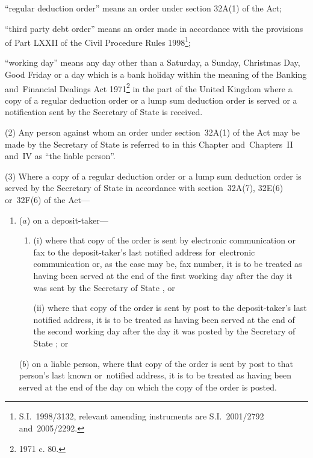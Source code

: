 \documentclass[12pt,a4paper]{article}
\begin{document}
\begin{enumerate}
“regular deduction order” means an order under section 32A(1) of the Act;

“third party debt order” means an order made in accordance with the provisions of Part LXXII of the Civil Procedure Rules 1998\footnote{S.I.~1998/3132, relevant amending instruments are S.I.~2001/2792 and~2005/2292.};

“working day” means any day other than a Saturday, a Sunday, Christmas Day, Good Friday or a day which is a bank holiday within the meaning of the Banking and~Financial Dealings Act 1971\footnote{1971 c. 80.} in the part of the United Kingdom where a copy of a regular deduction order or a lump sum deduction order is served or a notification sent by the %
Secretary of State  %
is received.
\end{enumerate}

(2) Any person against whom an order under section~32A(1) of the Act may be made by the  %
Secretary of State  %
is referred to in this Chapter and~Chapters~II and~IV as “the liable person”.

(3) Where a copy of a regular deduction order or a lump sum deduction order is served by the  
Secretary of State  %
in accordance with section~32A(7), 32E(6) or~32F(6) of the Act—
\begin{enumerate}\item[]
($a$) on a deposit-taker—
\begin{enumerate}\item[]
(i) where that copy of the order is sent by electronic communication or fax to the deposit-taker’s last notified address for~electronic communication or, as the case may be, fax number, it is to be treated as having been served at the end of the first working day after the day it was sent by the 
Secretary of State%
, or

(ii) where that copy of the order is sent by post to the deposit-taker’s last notified address, it is to be treated as having been served at the end of the second working day after the day it was posted by the 
Secretary of State%
; or
\end{enumerate}

($b$) on a liable person, where that copy of the order is sent by post to that person’s last known or~notified address, it is to be treated as having been served at the end of the day on which the copy of the order is posted.
\end{enumerate}
\end{document}

